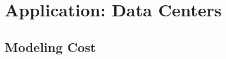 
\chapter{Application: Data Centers}\label{chapter:application_data_centers}

\section{Modeling Cost}
